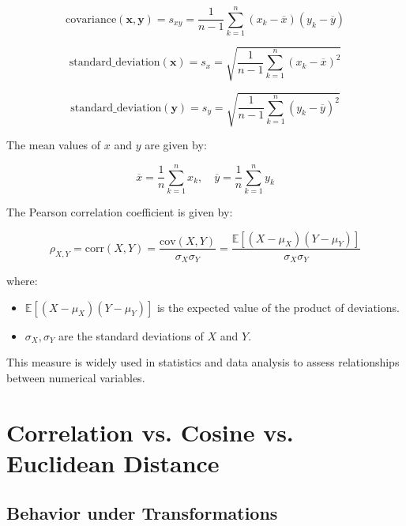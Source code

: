 \documentclass[a4paper,12pt]{article}
\begin{document}
\begin{equation}
\text{covariance}(\mathbf{x}, \mathbf{y}) = s_{xy} = \frac{1}{n-1} \sum_{k=1}^{n} (x_k - \overline{x}) (y_k - \overline{y})
\end{equation}

\begin{equation}
\text{standard\_deviation}(\mathbf{x}) = s_x = \sqrt{\frac{1}{n-1} \sum_{k=1}^{n} (x_k - \overline{x})^2}
\end{equation}

\begin{equation}
\text{standard\_deviation}(\mathbf{y}) = s_y = \sqrt{\frac{1}{n-1} \sum_{k=1}^{n} (y_k - \overline{y})^2}
\end{equation}

The mean values of \( x \) and \( y \) are given by:

\begin{equation}
\overline{x} = \frac{1}{n} \sum_{k=1}^{n} x_k, \quad \overline{y} = \frac{1}{n} \sum_{k=1}^{n} y_k
\end{equation}

The Pearson correlation coefficient is given by:

\begin{equation}
\rho_{X,Y} = \text{corr}(X, Y) = \frac{\text{cov}(X, Y)}{\sigma_X \sigma_Y} = \frac{\mathbb{E}[(X - \mu_X)(Y - \mu_Y)]}{\sigma_X \sigma_Y}
\end{equation}

where:
\begin{itemize}
    \item \( \mathbb{E}[(X - \mu_X)(Y - \mu_Y)] \) is the expected value of the product of deviations.
    \item \( \sigma_X, \sigma_Y \) are the standard deviations of \( X \) and \( Y \).
\end{itemize}

This measure is widely used in statistics and data analysis to assess relationships between numerical variables.


\section*{Correlation vs. Cosine vs. Euclidean Distance}


\subsection*{Behavior under Transformations}
\end{document}
